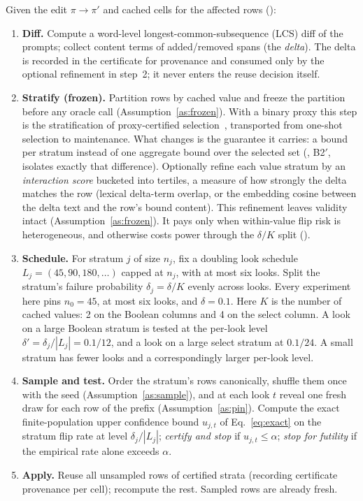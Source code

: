 Given the edit $\pi\to\pi'$ and cached cells for the affected rows
():
\begin{enumerate}
\item \textbf{Diff.} Compute a word-level longest-common-subsequence
(LCS) diff of the prompts; collect content terms of added/removed spans
(the \emph{delta}). The delta is recorded in the certificate for
provenance and consumed only by the optional refinement in step~2; it
never enters the reuse decision itself.
\item \textbf{Stratify (frozen).} Partition rows by cached value and
freeze the partition before any oracle call
(Assumption~\ref{as:frozen}). With a binary proxy this step is the
stratification of proxy-certified selection~\cite{supg}, transported
from one-shot selection to maintenance. What changes is the guarantee
it carries: a bound per stratum instead of one aggregate bound over
the selected set (, B2$'$, isolates exactly
that difference). Optionally refine each value stratum by an
\emph{interaction score} bucketed into tertiles, a measure of how strongly the delta matches
the row (lexical delta-term overlap, or the embedding cosine between the
delta text and the row's bound content). This
refinement leaves validity intact
(Assumption~\ref{as:frozen}). It pays only when
within-value flip risk is heterogeneous, and otherwise costs power
through the $\delta/K$ split ().
\item \textbf{Schedule.} For stratum $j$ of size $n_j$, fix a doubling
look schedule $L_j = (45, 90, 180, \dots)$ capped at $n_j$, with at most
six looks. Split the stratum's failure probability $\delta_j = \delta/K$
evenly across looks. Every experiment here pins $n_0{=}45$, at most six
looks, and $\delta{=}0.1$. Here $K$ is the number of cached values: 2 on the
Boolean columns and 4 on the select column. A look on a large
Boolean stratum is tested at the per-look level
$\delta' = \delta_j/|L_j| = 0.1/12$, and a look on a large select
stratum at $0.1/24$. A small stratum has fewer looks and a
correspondingly larger per-look level.
\item \textbf{Sample and test.} Order the stratum's rows canonically,
shuffle them once with the seed (Assumption~\ref{as:sample}), and at
each look $t$ reveal one fresh draw for each row of the prefix
(Assumption~\ref{as:pin}). Compute the exact finite-population upper
confidence bound $u_{j,t}$ of Eq.~\eqref{eq:exact} on the stratum flip
rate at level $\delta_j/|L_j|$; \emph{certify and stop} if
$u_{j,t} \le \alpha$; \emph{stop for futility} if the empirical rate
alone exceeds $\alpha$.
\item \textbf{Apply.} Reuse all unsampled rows of certified strata
(recording certificate provenance per cell); recompute the rest.
Sampled rows are already fresh.
\end{enumerate}
